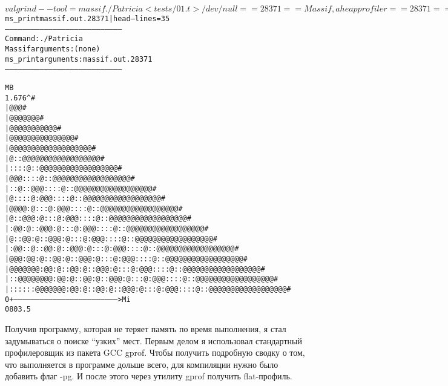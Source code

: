 \documentclass[pdf, unicode, 12pt, a4paper,oneside,fleqn]{article}
\begin{document}
\begin{alltt}
$ valgrind --tool=massif ./Patricia < tests/01.t > /dev/null
==28371== Massif, a heap profiler
==28371== Copyright (C) 2003-2015, and GNU GPL'd, by Nicholas Nethercote
==28371== Using Valgrind-3.12.0 and LibVEX; rerun with -h for copyright info
==28371== Command: ./Patricia
==28371==
==28371==
$ ms_print massif.out.28371 | head --lines=35
--------------------------------------------------------------------------------
Command:            ./Patricia
Massif arguments:   (none)
ms_print arguments: massif.out.28371
--------------------------------------------------------------------------------


    MB
1.676^                                                                       #
     |                                                                    @@@#
     |                                                                @@@@@@@#
     |                                                            @@@@@@@@@@@#
     |                                                        @@@@@@@@@@@@@@@#
     |                                                    @@@@@@@@@@@@@@@@@@@#
     |                                                 @::@ @@@@@@@@@@@@@@@@@#
     |                                             ::::@::@ @@@@@@@@@@@@@@@@@#
     |                                          @@@::::@::@ @@@@@@@@@@@@@@@@@#
     |                                     ::@::@@@::::@::@ @@@@@@@@@@@@@@@@@#
     |                                  @::::@: @@@::::@::@ @@@@@@@@@@@@@@@@@#
     |                             @@@@:@: ::@: @@@::::@::@ @@@@@@@@@@@@@@@@@#
     |                          @::@ @@:@: ::@: @@@::::@::@ @@@@@@@@@@@@@@@@@#
     |                      :@@:@::@ @@:@: ::@: @@@::::@::@ @@@@@@@@@@@@@@@@@#
     |                    @::@@:@::@ @@:@: ::@: @@@::::@::@ @@@@@@@@@@@@@@@@@#
     |               :@@::@::@@:@::@ @@:@: ::@: @@@::::@::@ @@@@@@@@@@@@@@@@@#
     |            @@@:@@: @::@@:@::@ @@:@: ::@: @@@::::@::@ @@@@@@@@@@@@@@@@@#
     |        @@@@@@@:@@: @::@@:@::@ @@:@: ::@: @@@::::@::@ @@@@@@@@@@@@@@@@@#
     |    ::@@@@@ @@@:@@: @::@@:@::@ @@:@: ::@: @@@::::@::@ @@@@@@@@@@@@@@@@@#
     |::::::@ @@@ @@@:@@: @::@@:@::@ @@:@: ::@: @@@::::@::@ @@@@@@@@@@@@@@@@@#
   0 +----------------------------------------------------------------------->Mi
     0                                                                   803.5
\end{alltt}
\newpage
Получив программу, которая не теряет память по время выполнения, я стал задумываться о поиске \enquote{узких} мест. Первым делом я использовал стандартный профилеровщик из пакета GCC gprof. Чтобы получить подробную сводку о том, что выполняется в программе дольше всего, для компиляции нужно было добавить флаг -pg. И после этого через утилиту gprof получить flat-профиль.\\
\end{document}

